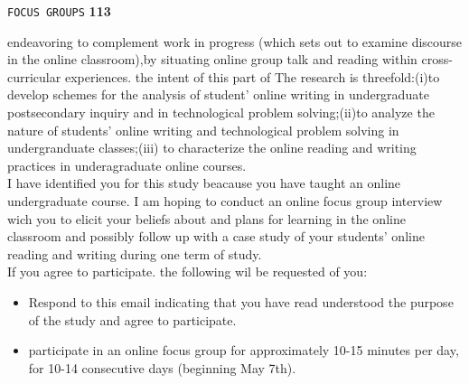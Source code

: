 \documentclass[a4]{book}
\begin{document}
\newpage
\begin{flushright}
 \texttt{FOCUS GROUPS} \hspace*{1cm} \textbf{113}
\end{flushright}

\vspace*{0.5cm}
endeavoring to complement work in progress (which sets out to examine discourse in the online classroom),by situating online group talk and reading within cross-curricular experiences. the intent of this part of The research is threefold:(i)to develop schemes for the analysis of student' online writing in undergraduate postsecondary inquiry and in technological problem solving;(ii)to analyze the nature of students' online writing and technological problem solving in undergranduate classes;(iii) to characterize the online reading and writing practices in underagraduate online courses.\\

\vspace*{0.4cm}
I have identified you for this study beacause you have taught an online undergraduate course. I am hoping to conduct an online focus group interview wich you to elicit your beliefs about and plans for learning in the online classroom and possibly follow up with a case study of your students' online reading and writing during one term of study.\\

\vspace*{0.3cm}
If you agree to participate. the following wil be requested of you:\\
\vspace*{0.2cm}

\begin{itemize}
  \item Respond to this email indicating that you have read understood the purpose of the study and agree to participate.\\

  \vspace*{0.2cm}

  \item participate in an online focus group for approximately 10-15 minutes per day, for 10-14 consecutive days (beginning May 7th).\\

\end{itemize}
\end{document}
